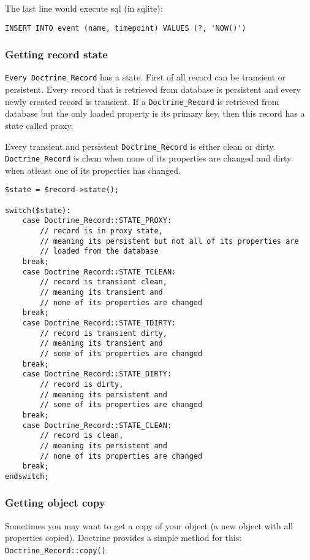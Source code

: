 \documentclass[11pt,a4paper]{report}
\begin{document}
The last line would execute sql (in sqlite):

\begin{verbatim}
INSERT INTO event (name, timepoint) VALUES (?, 'NOW()')
\end{verbatim}

\subsubsection{Getting record state}
\texttt{Every Doctrine\_Record} has a state. First of all record can be transient or persistent. Every record that is retrieved from database is persistent and every newly created record is transient. If a \texttt{Doctrine\_Record} is retrieved from database but the only loaded property is its primary key, then this record has a state called proxy.

Every transient and persistent \texttt{Doctrine\_Record} is either clean or dirty. \texttt{Doctrine\_Record} is clean when none of its properties are changed and dirty when atleast one of its properties has changed.

\begin{verbatim}
$state = $record->state();

switch($state):
    case Doctrine_Record::STATE_PROXY:
        // record is in proxy state,
        // meaning its persistent but not all of its properties are
        // loaded from the database
    break;
    case Doctrine_Record::STATE_TCLEAN:
        // record is transient clean,
        // meaning its transient and
        // none of its properties are changed
    break;
    case Doctrine_Record::STATE_TDIRTY:
        // record is transient dirty,
        // meaning its transient and
        // some of its properties are changed
    break;
    case Doctrine_Record::STATE_DIRTY:
        // record is dirty,
        // meaning its persistent and
        // some of its properties are changed
    break;
    case Doctrine_Record::STATE_CLEAN:
        // record is clean,
        // meaning its persistent and
        // none of its properties are changed
    break;
endswitch;
\end{verbatim}

\subsubsection{Getting object copy}
Sometimes you may want to get a copy of your object (a new object with all properties copied). Doctrine provides a simple method for this: \texttt{Doctrine\_Record::copy()}.
\end{document}
